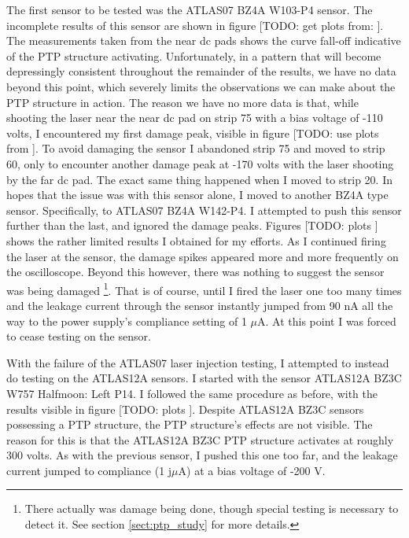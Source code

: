 \documentclass{report}
\begin{document}
            The first sensor to be tested was the ATLAS07 BZ4A W103-P4 sensor. The incomplete results of this sensor are shown in figure [TODO: get plots from:
            ]. The measurements taken from the near dc pads shows the curve fall-off indicative of the PTP structure activating. Unfortunately, in a pattern that will become depressingly consistent throughout the remainder of the results, we have no data beyond this point, which severely limits the observations we can make about the PTP structure in action. The reason we have no more data is that, while shooting the laser near the near dc pad on strip 75 with a bias voltage of -110 volts, I encountered my first damage peak, visible in figure [TODO: use plots from
            ]. To avoid damaging the sensor I abandoned strip 75 and moved to strip 60, only to encounter another damage peak at -170 volts with the laser shooting by the far dc pad. The exact same thing happened when I moved to strip 20. In hopes that the issue was with this sensor alone, I moved to another BZ4A type sensor. Specifically, to ATLAS07 BZ4A W142-P4. I attempted to push this sensor further than the last, and ignored the damage peaks. Figures [TODO: plots
            ] shows the rather limited results I obtained for my efforts. As I continued firing the laser at the sensor, the damage spikes appeared more and more frequently on the oscilloscope. Beyond this however, there was nothing to suggest the sensor was being damaged \footnote{There actually was damage being done, though special testing is necessary to detect it. See section \ref{sect:ptp_study} for more details.}. That is of course, until I fired the laser one too many times and the leakage current through the sensor instantly jumped from 90 nA all the way to the power supply's compliance setting of 1 $\mu$A. At this point I was forced to cease testing on the sensor.

            With the failure of the ATLAS07 laser injection testing, I attempted to instead do testing on the ATLAS12A sensors. I started with the sensor ATLAS12A BZ3C W757 Halfmoon: Left P14. I followed the same procedure as before, with the results visible in figure [TODO: plots
            ]. Despite ATLAS12A BZ3C sensors possessing a PTP structure, the PTP structure's effects are not visible. The reason for this is that the ATLAS12A BZ3C PTP structure activates at roughly 300 volts. As with the previous sensor, I pushed this one too far, and the leakage current jumped to compliance (1 j$\mu$A) at a bias voltage of -200 V.
\end{document}
